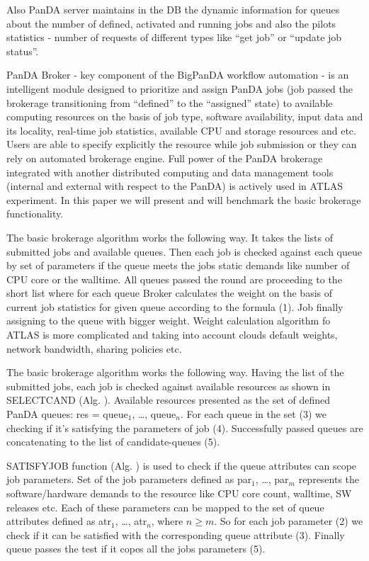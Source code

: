 Also PanDA server maintains in the DB the dynamic information for queues
about the number of defined, activated and running jobs and also the pilots
statistics - number of requests of different types like ``get job'' or
``update job status''.

PanDA Broker - key  component of the BigPanDA workflow automation - is an
intelligent module designed to prioritize and assign PanDA jobs (job passed
the brokerage transitioning from ``defined'' to the ``assigned'' state) to
available computing resources on the basis of job type, software
availability, input data and its locality, real-time job statistics,
available CPU and storage resources and etc. Users are able to specify
explicitly the resource while job submission or they can rely on automated
brokerage engine. Full power of the PanDA brokerage integrated with another
distributed computing and data management tools (internal and external with
respect to the PanDA) is actively used in ATLAS experiment. In this paper we
will present and will benchmark the basic brokerage functionality.

The basic brokerage algorithm works the following way. It takes the lists of
submitted jobs and available queues. Then each job is checked against each
queue by set of parameters if the queue meets the jobs static demands like
number of CPU core or the walltime. All queues passed the round are
proceeding to the short list where for each queue Broker calculates the
weight on the basis of current job statistics for given queue according to
the formula (1). Job finally assigning to the queue with bigger weight.
Weight calculation algorithm fo ATLAS is more complicated and taking into
account clouds default weights, network bandwidth, sharing policies etc.

The basic brokerage algorithm works the following way. Having the list of the
submitted jobs, each job is checked against available resources as shown in
SELECT{\textunderscore}CAND (Alg. ). Available resources presented as the set
of defined PanDA queues: res = queue$_1$, \ldots, queue$_n$. For each queue
in the set (3) we checking if it's satisfying the parameters of job (4).
Successfully passed queues are concatenating to the list of candidate-queues
(5).

SATISFY{\textunderscore}JOB function (Alg. ) is used to check if the queue
attributes can scope job parameters. Set of the job parameters defined as
par$_1$, \ldots, par$_m$ represents the software/hardware demands to the
resource like CPU core count, walltime, SW releases etc. Each of these
parameters can be mapped to the set of queue attributes defined as atr$_1$,
\ldots, atr$_n$, where $n \geq m$. So for each job parameter (2) we check if
it can be satisfied with the corresponding queue attribute (3). Finally queue
passes the test if it copes all the jobs parameters (5).

